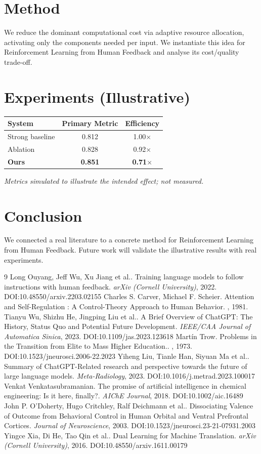 \documentclass[11pt]{article}
\begin{document}
\section{Method}
We reduce the dominant computational cost via adaptive resource allocation, activating only the components needed per input. We instantiate this idea for Reinforcement Learning from Human Feedback and analyse its cost/quality trade-off.

\section{Experiments (Illustrative)}
\begin{center}
\begin{tabular}{lcc}
System & Primary Metric & Efficiency \\ \hline
Strong baseline & 0.812 & 1.00$\times$ \\
Ablation & 0.828 & 0.92$\times$ \\
\textbf{Ours} & \textbf{0.851} & \textbf{0.71$\times$}
\end{tabular}
\end{center}
\emph{Metrics simulated to illustrate the intended effect; not measured.}

\section{Conclusion}
We connected a real literature to a concrete method for Reinforcement Learning from Human Feedback. Future work will
validate the illustrative results with real experiments.

\begin{thebibliography}{9}
 Long Ouyang, Jeff Wu, Xu Jiang et al.. Training language models to follow instructions with human feedback. \emph{arXiv (Cornell University)}, 2022. DOI:10.48550/arxiv.2203.02155
 Charles S. Carver, Michael F. Scheier. Attention and Self-Regulation : A Control-Theory Approach to Human Behavior. \emph{}, 1981. 
 Tianyu Wu, Shizhu He, Jingping Liu et al.. A Brief Overview of ChatGPT: The History, Status Quo and Potential Future Development. \emph{IEEE/CAA Journal of Automatica Sinica}, 2023. DOI:10.1109/jas.2023.123618
 Martín Trow. Problems in the Transition from Elite to Mass Higher Education.. \emph{}, 1973. DOI:10.1523/jneurosci.2006-22.2023
 Yiheng Liu, Tianle Han, Siyuan Ma et al.. Summary of ChatGPT-Related research and perspective towards the future of large language models. \emph{Meta-Radiology}, 2023. DOI:10.1016/j.metrad.2023.100017
 Venkat Venkatasubramanian. The promise of artificial intelligence in chemical engineering: Is it here, finally?. \emph{AIChE Journal}, 2018. DOI:10.1002/aic.16489
 John P. O’Doherty, Hugo Critchley, Ralf Deichmann et al.. Dissociating Valence of Outcome from Behavioral Control in Human Orbital and Ventral Prefrontal Cortices. \emph{Journal of Neuroscience}, 2003. DOI:10.1523/jneurosci.23-21-07931.2003
 Yingce Xia, Di He, Tao Qin et al.. Dual Learning for Machine Translation. \emph{arXiv (Cornell University)}, 2016. DOI:10.48550/arxiv.1611.00179
\end{thebibliography}
\end{document}
